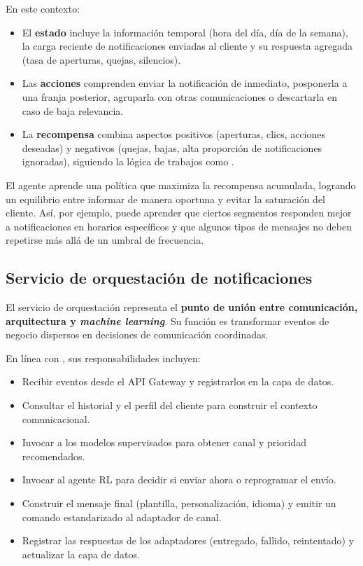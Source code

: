 \documentclass[conference]{IEEEtran}
\begin{document}
En este contexto:
\begin{itemize}
  \item El \textbf{estado} incluye la informaci{\'o}n temporal (hora del d{\'i}a, d{\'i}a de la semana), la carga reciente de notificaciones enviadas al cliente y su respuesta agregada (tasa de aperturas, quejas, silencios).
  \item Las \textbf{acciones} comprenden enviar la notificaci{\'o}n de inmediato, posponerla a una franja posterior, agruparla con otras comunicaciones o descartarla en caso de baja relevancia.
  \item La \textbf{recompensa} combina aspectos positivos (aperturas, clics, acciones deseadas) y negativos (quejas, bajas, alta proporci{\'o}n de notificaciones ignoradas), siguiendo la l{\'o}gica de trabajos como \cite{yancey2020,prabhakar2022}.
\end{itemize}

El agente aprende una pol{\'i}tica que maximiza la recompensa acumulada, logrando un equilibrio entre informar de manera oportuna y evitar la saturaci{\'o}n del cliente. As{\'i}, por ejemplo, puede aprender que ciertos segmentos responden mejor a notificaciones en horarios espec{\'i}ficos y que algunos tipos de mensajes no deben repetirse m{\'a}s all{\'a} de un umbral de frecuencia.

\subsection{Servicio de orquestaci{\'o}n de notificaciones}

El servicio de orquestaci{\'o}n representa el \textbf{punto de uni{\'o}n entre comunicaci{\'o}n, arquitectura y \textit{machine learning}}. Su funci{\'o}n es transformar eventos de negocio dispersos en decisiones de comunicaci{\'o}n coordinadas.

En l{\'i}nea con \cite{salami2022,nicolas2024}, sus responsabilidades incluyen:
\begin{itemize}
  \item Recibir eventos desde el API Gateway y registrarlos en la capa de datos.
  \item Consultar el historial y el perfil del cliente para construir el contexto comunicacional.
  \item Invocar a los modelos supervisados para obtener canal y prioridad recomendados.
  \item Invocar al agente RL para decidir si enviar ahora o reprogramar el env{\'i}o.
  \item Construir el mensaje final (plantilla, personalizaci{\'o}n, idioma) y emitir un comando estandarizado al adaptador de canal.
  \item Registrar las respuestas de los adaptadores (entregado, fallido, reintentado) y actualizar la capa de datos.
\end{itemize}
\end{document}
